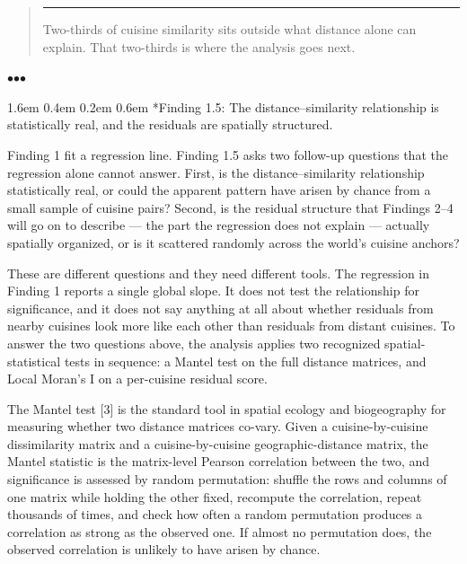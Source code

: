 \documentclass[11pt]{article}
\makeatletter
\renewcommand\section{\@startsection{section}{1}{\z@}%
  {1.6em \@plus 0.4em \@minus 0.2em}%
  {0.6em}%
  {\normalfont\Large\bfseries\color{black!85}}}
\newenvironment{pullquote}
  {\begin{quote}\itshape\color{black!72}\hspace*{-0.4em}\rule{2pt}{1em}\hspace{0.6em}}
  {\end{quote}}
\newcommand{\sectionbreak}{%
  \par\nobreak\vspace{0.8em}%
  \par\centerline{\textcolor{black!40}{$\bullet$\quad$\bullet$\quad$\bullet$}}%
  \par\vspace{0.6em}\nobreak%
}
\makeatother
\begin{document}
\begin{pullquote}
Two-thirds of cuisine similarity sits outside what distance alone can explain. That two-thirds is where the analysis goes next.
\end{pullquote}


\sectionbreak


\section*{Finding 1.5: The distance–similarity relationship is statistically real, and the residuals are spatially structured.}


Finding 1 fit a regression line. Finding 1.5 asks two follow-up questions that the regression alone cannot answer. First, is the distance–similarity relationship statistically real, or could the apparent pattern have arisen by chance from a small sample of cuisine pairs? Second, is the residual structure that Findings 2–4 will go on to describe — the part the regression does not explain — actually spatially organized, or is it scattered randomly across the world's cuisine anchors?


These are different questions and they need different tools. The regression in Finding 1 reports a single global slope. It does not test the relationship for significance, and it does not say anything at all about whether residuals from nearby cuisines look more like each other than residuals from distant cuisines. To answer the two questions above, the analysis applies two recognized spatial-statistical tests in sequence: a Mantel test on the full distance matrices, and Local Moran's I on a per-cuisine residual score.


The Mantel test [3] is the standard tool in spatial ecology and biogeography for measuring whether two distance matrices co-vary. Given a cuisine-by-cuisine dissimilarity matrix and a cuisine-by-cuisine geographic-distance matrix, the Mantel statistic is the matrix-level Pearson correlation between the two, and significance is assessed by random permutation: shuffle the rows and columns of one matrix while holding the other fixed, recompute the correlation, repeat thousands of times, and check how often a random permutation produces a correlation as strong as the observed one. If almost no permutation does, the observed correlation is unlikely to have arisen by chance.
\end{document}

